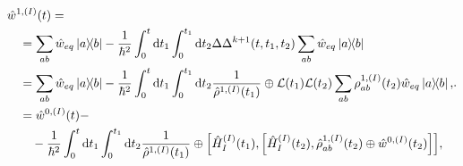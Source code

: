 \begin{equation}
\label{ansatz_RBP_iterative_Delta_with_k_1}
    \begin{aligned}
    &\hat{w}^{1,(I)}(t) =  \\
    &\quad =\sum_{ab} \hat{w}_{eq} \ketbra{a}{b} - \frac{1}{\hbar^2} \int_{0}^{t} \mathrm{d} t_1 \int_{0}^{t_1} \mathrm{d} t_2 \Delta\Delta^{k+1}(t, t_1, t_2) \sum_{ab} \hat{w}_{eq} \ketbra{a}{b} \\
    &\quad =\sum_{ab} \hat{w}_{eq} \ketbra{a}{b} - \frac{1}{\hbar^2} \int_{0}^{t} \mathrm{d} t_1 \int_{0}^{t_1} \mathrm{d} t_2 \frac{1}{\hat{\rho}^{1, (I)}(t_1)} \oplus \mathcal{L}(t_1) \mathcal{L}(t_2) \sum_{ab} \rho_{ab}^{1, (I)}(t_2) \hat{w}_{eq} \ketbra{a}{b}, \\
    &\quad = \hat{w}^{0, (I)}(t) - \\
    &\quad \quad -\frac{1}{\hbar^2} \int_{0}^{t} \mathrm{d} t_1 \int_{0}^{t_1} \mathrm{d} t_2 \frac{1}{\hat{\rho}^{1, (I)}(t_1)} \oplus \Big[\hat{H}_{I}^{(I)}(t_1), \Big[\hat{H}_{I}^{(I)}(t_2), \hat{\rho}_{ab}^{1, (I)}(t_2) \oplus \hat{w}^{0, (I)}(t_2) \Big]\Big] , \\
    \end{aligned}.
\end{equation}

